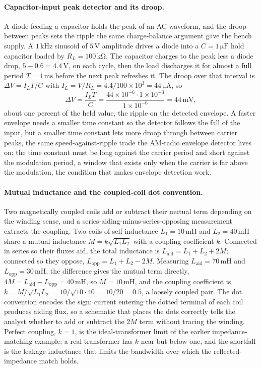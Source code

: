 \paragraph{Capacitor-input peak detector and its droop.}
A diode feeding a capacitor holds the peak of an AC waveform, and the droop
between peaks sets the ripple the same charge-balance argument gave the bench
supply. A $1\,\si{\kilo\hertz}$ sinusoid of $5\,\si{\volt}$ amplitude drives a
diode into a $C = 1\,\si{\micro\farad}$ hold capacitor loaded by $R_L =
100\,\si{\kilo\ohm}$. The capacitor charges to the peak less a diode drop,
$5 - 0.6 = 4.4\,\si{\volt}$, on each cycle, then the load discharges it for
almost a full period $T = 1\,\si{\milli\second}$ before the next peak refreshes
it. The droop over that interval is $\Delta V = I_L T/C$ with $I_L = V/R_L =
4.4/100\times 10^{3} = 44\,\si{\micro\ampere}$, so
\[
\Delta V = \frac{I_L T}{C}
= \frac{44\times 10^{-6}\cdot 1\times 10^{-3}}{1\times 10^{-6}}
= 44\,\si{\milli\volt},
\]
about one percent of the held value, the ripple on the detected envelope. A
faster envelope needs a smaller time constant so the detector follows the fall
of the input, but a smaller time constant lets more droop through between
carrier peaks, the same speed-against-ripple trade the AM-radio envelope
detector lives on: the time constant must be long against the carrier period and
short against the modulation period, a window that exists only when the carrier
is far above the modulation, the condition that makes envelope detection work.

\paragraph{Mutual inductance and the coupled-coil dot convention.}
Two magnetically coupled coils add or subtract their mutual term depending on
the winding sense, and a series-aiding-minus-series-opposing measurement
extracts the coupling. Two coils of self-inductance $L_1 = 10\,\si{\milli
\henry}$ and $L_2 = 40\,\si{\milli\henry}$ share a mutual inductance $M = k
\sqrt{L_1 L_2}$ with a coupling coefficient $k$. Connected in series so their
fluxes aid, the total inductance is $L_{\text{aid}} = L_1 + L_2 + 2M$; connected
so they oppose, $L_{\text{opp}} = L_1 + L_2 - 2M$. Measuring $L_{\text{aid}} =
70\,\si{\milli\henry}$ and $L_{\text{opp}} = 30\,\si{\milli\henry}$, the
difference gives the mutual term directly, $4M = L_{\text{aid}} - L_{\text{opp}}
= 40\,\si{\milli\henry}$, so $M = 10\,\si{\milli\henry}$, and the coupling
coefficient is $k = M/\sqrt{L_1 L_2} = 10/\sqrt{10\cdot 40} = 10/20 = 0.5$, a
loosely coupled pair. The dot convention encodes the sign: current entering the
dotted terminal of each coil produces aiding flux, so a schematic that places
the dots correctly tells the analyst whether to add or subtract the $2M$ term
without tracing the winding. Perfect coupling, $k = 1$, is the ideal-transformer
limit of the earlier impedance-matching example; a real transformer has $k$ near
but below one, and the shortfall is the leakage inductance that limits the
bandwidth over which the reflected-impedance match holds.

